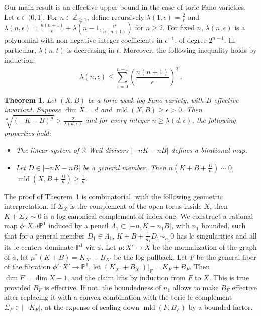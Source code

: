 \documentclass[12pt,twoside]{amsart}
\newcommand{\Z}{{\mathbb Z}}
\newcommand{\R}{{\mathbb R}}
\newcommand{\bP}{{\mathbb P}} %
\newcommand{\mld}{\operatorname{mld}}
\theoremstyle{plain}
\newtheorem{thm}{Theorem}[section]
\theoremstyle{definition}
\theoremstyle{remark}
\begin{document}
Our main result is an effective upper bound in the case of toric Fano varieties.
Let $\epsilon\in (0,1]$. For $n\in \Z_{\ge 1}$, define recursively $\lambda(1,\epsilon)=\frac{2}{\epsilon}$
and $\lambda(n,\epsilon)=\frac{n(n+1)}{\epsilon}+\lambda(n-1,\frac{\epsilon^2}{n(n+1)})$ for $n\ge 2$.
For fixed $n$, $\lambda(n,\epsilon)$ is a polynomial with non-negative integer coefficients in $\epsilon^{-1}$,
of degree $2^{n-1}$. In particular, $\lambda(n,t)$ is decreasing in $t$. Moreover, the following inequality 
holds by induction:
$$
\lambda (n,\epsilon)\le \sum_{i=0}^{n-1} (\frac{n(n+1)}{\epsilon})^{2^i}.
$$

\begin{thm}\label{kF} 
	Let $(X,B)$ be a toric weak log Fano variety, with $B$ effective invariant. 
	Suppose $\dim X=d$ and $\mld(X,B)\ge \epsilon>0$. Then 
	$
	\sqrt[d]{(-K-B)^d} > \frac{2}{\lambda(d,\epsilon)}
	$
	and for every integer $n\ge \lambda(d,\epsilon)$, the following properties hold:
	\begin{itemize}
		\item The linear system of $\R$-Weil divisors $|-nK-nB|$ defines a birational map.
		\item Let $D\in |-nK-nB|$ be a general member. Then $n(K+B+\frac{D}{n})\sim 0$, $\mld(X,B+\frac{D}{n})\ge \frac{1}{n}$.
	\end{itemize}
\end{thm}

The proof of Theorem~\ref{kF} is combinatorial, with the following geometric interpretation.
If $\Sigma_X$ is the complement of the open torus inside $X$, then $K+\Sigma_X\sim 0$
is a log canonical complement of index one. We construct a rational map $\phi \colon X\dashrightarrow \bP^1$
induced by a pencil $\Lambda_1 \subset |-n_1K-n_1B|$, with $n_1$ bounded, such that
for a general member $D_1\in \Lambda_1$, $K+B+\frac{1}{n_1}D_1\sim_{n_1}0$ 
has lc singularities and all its lc centers dominate $\bP^1$ via $\phi$.
Let $\mu\colon X'\to X$ be the normalization of the graph of $\phi$, let $\mu^*(K+B)=K_{X'}+B_{X'}$ be
the log pullback. Let $F$ be the general fiber of the fibration $\phi'\colon X'\to \bP^1$, let
$(K_{X'}+B_{X'})|_F=K_F+B_F$. Then $\dim F=\dim X-1$, and the claim lifts by induction
from $F$ to $X$. This is true provided $B_F$ is effective. If not, 
the boundedness of $n_1$ allows to make $B_F$ effective after replacing it with a convex combination with the toric 
lc complement $\Sigma_F\in |-K_F|$, at the expense of scaling down $\mld(F,B_F)$ by a bounded factor.
\end{document}
